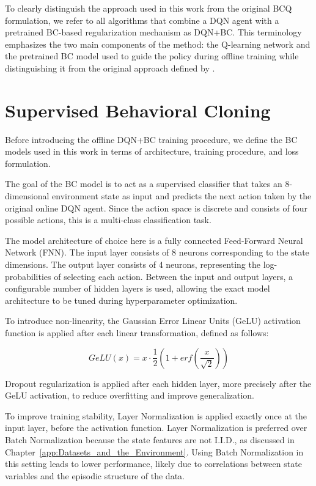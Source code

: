 To clearly distinguish the approach used in this work from the original BCQ formulation, we refer to all algorithms that combine a DQN agent with a pretrained BC-based regularization mechanism as DQN+BC. This terminology emphasizes the two main components of the method: the Q-learning network and the pretrained BC model used to guide the policy during offline training while distinguishing it from the original approach defined by \cite{BCQ_benchmarking}.





\section{Supervised Behavioral Cloning}
\label{sec:supervised_Behaviour_cloning}
Before introducing the offline DQN+BC training procedure, we define the BC models used in this work in terms of architecture, training procedure, and loss formulation.

The goal of the BC model is to act as a supervised classifier that takes an 8-dimensional environment state as input and predicts the next action taken by the original online DQN agent. Since the action space is discrete and consists of four possible actions, this is a multi-class classification task.

The model architecture of choice here is a fully connected Feed-Forward Neural Network (FNN). The input layer consists of 8 neurons corresponding to the state dimensions. The output layer consists of 4 neurons, representing the log-probabilities of selecting each action. Between the input and output layers, a configurable number of hidden layers is used, allowing the exact model architecture to be tuned during hyperparameter optimization.

To introduce non-linearity, the Gaussian Error Linear Units (GeLU) activation function \cite{gelu} is applied after each linear transformation, defined as follows:

$$ GeLU(x) = x\cdot \frac{1}{2}(1 +erf(\frac{x}{\sqrt2} ))$$


Dropout regularization is applied after each hidden layer, more precisely after the GeLU activation, to reduce overfitting and improve generalization.

To improve training stability, Layer Normalization is applied exactly once at the input layer, before the activation function. Layer Normalization is preferred over Batch Normalization because the state features are not I.I.D., as discussed in Chapter~\ref{app:Datasets_and_the_Environment}. Using Batch Normalization in this setting leads to lower performance, likely due to correlations between state variables and the episodic structure of the data.


